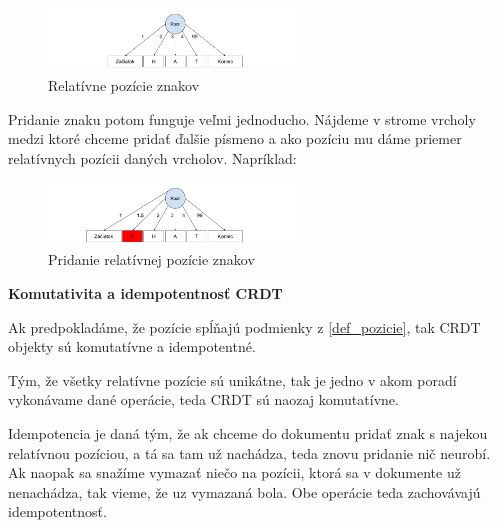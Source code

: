 \begin{figure}[H]
\centerline{\includegraphics[width=0.6\textwidth]{images/relativne_pozicie1}}
\caption[Relatívne pozície znakov]{Relatívne pozície znakov}
\label{obr:relativne}
\end{figure}

Pridanie znaku potom funguje veľmi jednoducho. Nájdeme v strome vrcholy medzi ktoré
chceme pridať ďalšie písmeno a ako pozíciu mu dáme priemer relatívnych pozícii daných
vrcholov. Napríklad:
\begin{figure}[H]
\centerline{\includegraphics[width=0.6\textwidth]{images/relativne_pozicie2}}
\caption[Pridanie relatívnej pozície znakov]{Pridanie relatívnej pozície znakov}
\label{obr:relativne_pridanie}
\end{figure}

\begin{flushleft}\textbf {Komutativita a idempotentnosť CRDT}\end{flushleft}
Ak predpokladáme, že pozície spĺňajú podmienky z \ref{def_pozicie}, tak CRDT objekty sú
komutatívne a idempotentné. 

Tým, že všetky relatívne pozície sú unikátne, tak je jedno v akom poradí vykonávame dané operácie,
teda CRDT sú naozaj komutatívne.

Idempotencia je daná tým, že ak chceme do dokumentu pridať znak s najekou relatívnou pozíciou, a tá
sa tam už nachádza, teda znovu pridanie nič neurobí. Ak naopak sa snažíme vymazať niečo na
pozícii, ktorá sa v dokumente už nenachádza, tak vieme, že uz vymazaná bola. Obe operácie teda
zachovávajú idempotentnosť.
\cite{nuno_preguica}

